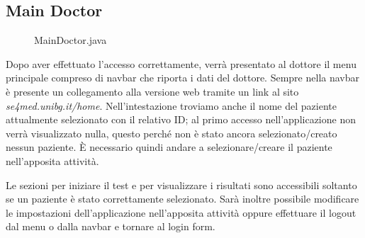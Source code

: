 \documentclass[
	corpo=12pt,
	twoside,
 	evenboxes,
	tipotesi=triennale,
    	stile=classica,
   	 greek,
]{toptesi}
\begin{document}
\vfill

\subsection{Main Doctor}
\label{subsec:maindoctor}
\begin{figure}[H]
\centering
{}
\caption{MainDoctor.java}
\label{fig:app_main_doctor_nav}
\end{figure}
Dopo aver effettuato l'accesso correttamente, verrà presentato al dottore il menu principale compreso di navbar che riporta i dati del dottore. Sempre nella navbar è presente un collegamento alla versione web tramite un link al sito \textit{se4med.unibg.it/home}. Nell'intestazione troviamo anche il nome del paziente attualmente selezionato con il relativo ID; al primo accesso nell'applicazione non verrà visualizzato nulla, questo perché non è stato ancora selezionato/creato nessun paziente. È necessario quindi andare a selezionare/creare il paziente nell'apposita attività. 

Le sezioni per iniziare il test e per visualizzare i risultati sono accessibili soltanto se un paziente è stato correttamente selezionato.
Sarà inoltre possibile modificare le impostazioni dell'applicazione nell'apposita attività oppure effettuare il logout dal menu o dalla navbar e tornare al login form.
\vfill
\end{document}
